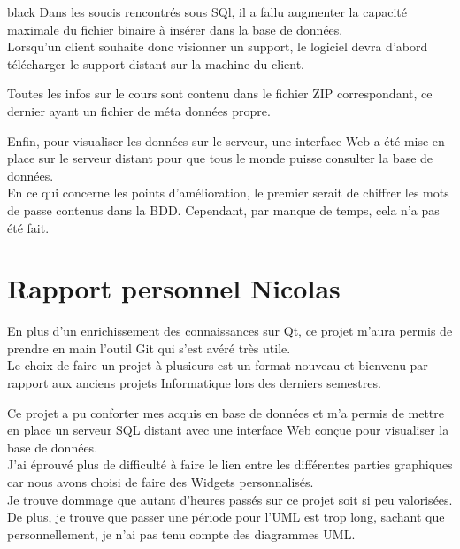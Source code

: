 {\begin{items}{black}{\Bullet}
Dans les soucis rencontrés sous SQl, il a fallu augmenter la capacité maximale du fichier binaire à insérer dans la base de données.\\

Lorsqu’un client souhaite donc visionner un support, le logiciel devra d’abord télécharger le support distant sur la machine du client.

Toutes les infos sur le cours sont contenu dans le fichier ZIP correspondant, ce dernier ayant un fichier de méta données propre.


Enfin, pour visualiser les données sur le serveur, une interface Web a été mise en place sur le serveur distant pour que tous le monde puisse consulter la base de données.\\

En ce qui concerne les points d'amélioration, le premier serait de chiffrer les mots de passe contenus dans la BDD. Cependant, par manque de temps, cela n'a pas été fait.



\section{Rapport personnel Nicolas}

En plus d'un enrichissement des connaissances sur Qt, ce projet m'aura permis de prendre en main l'outil Git qui s'est avéré très utile.\\

Le choix de faire un projet à plusieurs est un format nouveau et bienvenu 
par rapport aux anciens projets Informatique lors des derniers semestres.

Ce projet a pu conforter mes acquis en base de données et m'a permis de mettre en place un serveur SQL distant avec une interface Web conçue pour visualiser la base de données. \\

J'ai éprouvé plus de difficulté à faire le lien entre les différentes parties graphiques car nous avons choisi de faire des Widgets personnalisés.\\

Je trouve dommage que autant d'heures passés sur ce projet soit si peu valorisées.\\
De plus, je trouve que passer une période pour l'UML est trop long, sachant que personnellement, je n'ai pas tenu compte des diagrammes UML.\\






\end{items}}
